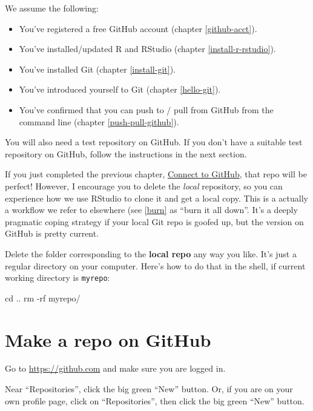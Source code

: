 \documentclass[
]{book}
\newenvironment{Shaded}{\begin{snugshade}}{\end{snugshade}}
\newcommand{\NormalTok}[1]{#1}
\providecommand{\tightlist}{%
  \setlength{\itemsep}{0pt}\setlength{\parskip}{0pt}}
\begin{document}
We assume the following:

\begin{itemize}
\tightlist
\item
  You've registered a free GitHub account (chapter \ref{github-acct}).
\item
  You've installed/updated R and RStudio (chapter \ref{install-r-rstudio}).
\item
  You've installed Git (chapter \ref{install-git}).
\item
  You've introduced yourself to Git (chapter \ref{hello-git}).
\item
  You've confirmed that you can push to / pull from GitHub from the command line (chapter \ref{push-pull-github}).
\end{itemize}

You will also need a test repository on GitHub.
If you don't have a suitable test repository on GitHub, follow the instructions in the next section.

If you just completed the previous chapter, \hyperref[push-pull-github]{Connect to GitHub}, that repo will be perfect!
However, I encourage you to delete the \emph{local} repository, so you can experience how we use RStudio to clone it and get a local copy.
This is a actually a workflow we refer to elsewhere (see \ref{burn} as ``burn it all down''.
It's a deeply pragmatic coping strategy if your local Git repo is goofed up, but the version on GitHub is pretty current.

Delete the folder corresponding to the \textbf{local repo} any way you like.
It's just a regular directory on your computer.
Here's how to do that in the shell, if current working directory is \texttt{myrepo}:

\begin{Shaded}
\begin{Highlighting}[]
\NormalTok{cd ..}
\NormalTok{rm {-}rf myrepo/}
\end{Highlighting}
\end{Shaded}

\section{Make a repo on GitHub}\label{make-a-repo-on-github-1}

Go to \url{https://github.com} and make sure you are logged in.

Near ``Repositories'', click the big green ``New'' button.
Or, if you are on your own profile page, click on ``Repositories'', then click the big green ``New'' button.
\end{document}
